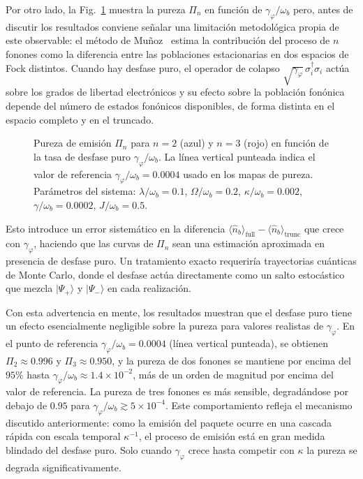Por otro lado, la Fig.~\ref{fig:deph_purity} muestra la pureza $\Pi_n$ en función de $\gamma_\varphi/\omega_b$ pero, antes de discutir los resultados conviene señalar una limitación metodológica propia de este observable: el método de Muñoz~\cite{munoz2018} estima la contribución del proceso de $n$ fonones como la diferencia entre las poblaciones estacionarias en dos espacios de Fock distintos. Cuando hay desfase puro, el operador de colapso $\sqrt{\gamma_\varphi} \,\sigma_i^\dagger\sigma_i$ actúa sobre los grados de libertad electrónicos y su efecto sobre la población fonónica depende del número de estados fonónicos disponibles, de forma distinta en el espacio completo y en el truncado. 

\begin{figure}[H]
	\centering
	
	\caption{Pureza de emisión $\Pi_n$ para $n=2$ (azul) y $n=3$ (rojo) en función de la tasa de desfase puro $\gamma_\varphi/\omega_b$. La línea vertical punteada indica el valor de referencia $\gamma_\varphi/\omega_b = 0.0004$ usado en los mapas de pureza. Parámetros del sistema: $\lambda/\omega_b = 0.1$, $\Omega/\omega_b = 0.2$, $\kappa/\omega_b = 0.002$, $\gamma/\omega_b = 0.0002$, $J/\omega_b = 0.5$.}
	\label{fig:deph_purity}
\end{figure}

Esto introduce un error sistemático en la diferencia $\langle\hat{n}_b\rangle_\mathrm{full} - \langle\hat{n}_b\rangle_\mathrm{trunc}$ que crece con $\gamma_\varphi$, haciendo que las curvas de $\Pi_n$ sean una estimación aproximada en presencia de desfase puro. Un tratamiento exacto requeriría trayectorias cuánticas de Monte Carlo, donde el desfase actúa directamente como un salto estocástico que mezcla $|\Psi_+\rangle$ y $|\Psi_-\rangle$ en cada realización.

Con esta advertencia en mente, los resultados muestran que el desfase puro tiene un efecto esencialmente negligible sobre la pureza para valores realistas de $\gamma_\varphi$. En el punto de referencia $\gamma_\varphi/\omega_b = 0.0004$ (línea vertical punteada), se obtienen $\Pi_2 \approx 0.996$ y $\Pi_3 \approx 0.950$, y la pureza de dos fonones se mantiene por encima del $95\%$ hasta $\gamma_\varphi/\omega_b \approx 1.4\times10^{-2}$, más de un orden de magnitud por encima del valor de referencia. La pureza de tres fonones es más sensible, degradándose por debajo de $0.95$ para $\gamma_\varphi/\omega_b \gtrsim 5\times10^{-4}$. Este comportamiento refleja el mecanismo discutido anteriormente: como la emisión del paquete ocurre en una cascada rápida con escala temporal $\kappa^{-1}$, el proceso de emisión está en gran medida blindado del desfase puro. Solo cuando $\gamma_\varphi$ crece hasta competir con $\kappa$ la pureza se degrada significativamente.